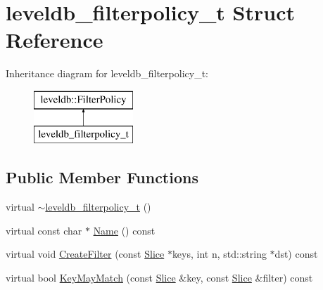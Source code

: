 \hypertarget{structleveldb__filterpolicy__t}{}\section{leveldb\+\_\+filterpolicy\+\_\+t Struct Reference}
\label{structleveldb__filterpolicy__t}
Inheritance diagram for leveldb\+\_\+filterpolicy\+\_\+t\+:\begin{figure}[H]
\begin{center}
\leavevmode
\includegraphics[height=2.000000cm]{structleveldb__filterpolicy__t}
\end{center}
\end{figure}
\subsection*{Public Member Functions}
\begin{DoxyCompactItemize}
\item 
virtual \hyperlink{structleveldb__filterpolicy__t_afea40a87cf4123be464f22d021dec9f3}{$\sim$leveldb\+\_\+filterpolicy\+\_\+t} ()
\item 
virtual const char $\ast$ \hyperlink{structleveldb__filterpolicy__t_a2d2e4bed02de91075ce921005c851a3e}{Name} () const 
\item 
virtual void \hyperlink{structleveldb__filterpolicy__t_a8b5b77b6a8d1c526905c7eb57d78558b}{Create\+Filter} (const \hyperlink{classleveldb_1_1_slice}{Slice} $\ast$keys, int n, std\+::string $\ast$dst) const 
\item 
virtual bool \hyperlink{structleveldb__filterpolicy__t_aa3006a26cac563bb5115d27d83b6865f}{Key\+May\+Match} (const \hyperlink{classleveldb_1_1_slice}{Slice} \&key, const \hyperlink{classleveldb_1_1_slice}{Slice} \&filter) const 
\end{DoxyCompactItemize}
